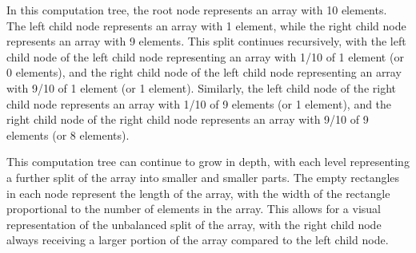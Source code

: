 
In this computation tree, the root node represents an array with 10 elements. The left child node represents an array with 1 element, while the right child node represents an array with 9 elements. This split continues recursively, with the left child node of the left child node representing an array with 1/10 of 1 element (or 0 elements), and the right child node of the left child node representing an array with 9/10 of 1 element (or 1 element). Similarly, the left child node of the right child node represents an array with 1/10 of 9 elements (or 1 element), and the right child node of the right child node represents an array with 9/10 of 9 elements (or 8 elements).

This computation tree can continue to grow in depth, with each level representing a further split of the array into smaller and smaller parts. The empty rectangles in each node represent the length of the array, with the width of the rectangle proportional to the number of elements in the array. This allows for a visual representation of the unbalanced split of the array, with the right child node always receiving a larger portion of the array compared to the left child node. 

